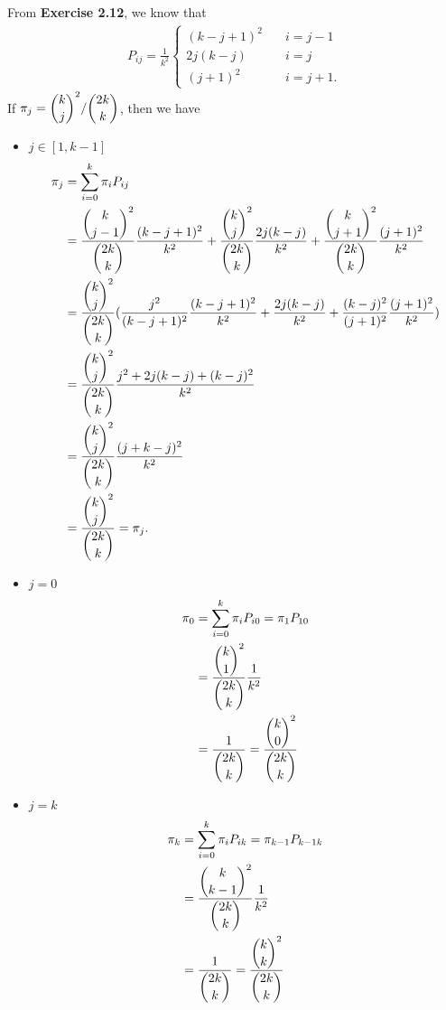 \documentclass{article}
\begin{document}
\subsection{}
From \textbf{Exercise 2.12}, we know that
\begin{align*}
    P_{ij} = \frac{1}{k^2}
    \begin{cases}
    (k-j+1)^2&\quad i=j-1 \\
    2j(k-j)&\quad i=j \\
    (j+1)^2&\quad i=j+1.
    \end{cases}
\end{align*}
If $\pi_j = \dbinom{k}{j}^2 / \dbinom{2k}{k}$, then we have
\begin{itemize}
    \item $j \in [1, k-1]$
        \begin{align*}
            \pi_j &= \sum_{i=0}^k \pi_i P_{ij} \\
            &= \frac{\dbinom{k}{j-1}^2}{\dbinom{2k}{k}} \frac{(k-j+1)^2}{k^2} + \frac{\dbinom{k}{j}^2}{\dbinom{2k}{k}} \frac{2j(k-j)}{k^2} + \frac{\dbinom{k}{j+1}^2}{\dbinom{2k}{k}} \frac{(j+1)^2}{k^2} \\
            &= \frac{\dbinom{k}{j}^2}{\dbinom{2k}{k}} (\frac{j^2}{(k-j+1)^2}\frac{(k-j+1)^2}{k^2}+\frac{2j(k-j)}{k^2}+\frac{(k-j)^2}{(j+1)^2}\frac{(j+1)^2}{k^2}) \\
            &= \frac{\dbinom{k}{j}^2}{\dbinom{2k}{k}} \frac{j^2+2j(k-j)+(k-j)^2}{k^2} \\
            &= \frac{\dbinom{k}{j}^2}{\dbinom{2k}{k}} \frac{(j+k-j)^2}{k^2} \\
            &= \frac{\dbinom{k}{j}^2}{\dbinom{2k}{k}} = \pi_j.
        \end{align*}
    \item $j=0$
        \begin{align*}
            \pi_0 &= \sum_{i=0}^k \pi_i P_{i0} = \pi_1P_{10} \\
            &= \frac{\dbinom{k}{1}^2}{\dbinom{2k}{k}} \frac{1}{k^2} \\
            &= \frac{1}{\dbinom{2k}{k}}=\frac{\dbinom{k}{0}^2}{\dbinom{2k}{k}}
        \end{align*}
    \item $j=k$
        \begin{align*}
            \pi_k &= \sum_{i=0}^k \pi_i P_{ik} = \pi_{k-1}P_{k-1k} \\
            &= \frac{\dbinom{k}{k-1}^2}{\dbinom{2k}{k}} \frac{1}{k^2} \\
            &= \frac{1}{\dbinom{2k}{k}}=\frac{\dbinom{k}{k}^2}{\dbinom{2k}{k}}
        \end{align*}
\end{itemize}
\end{document}
